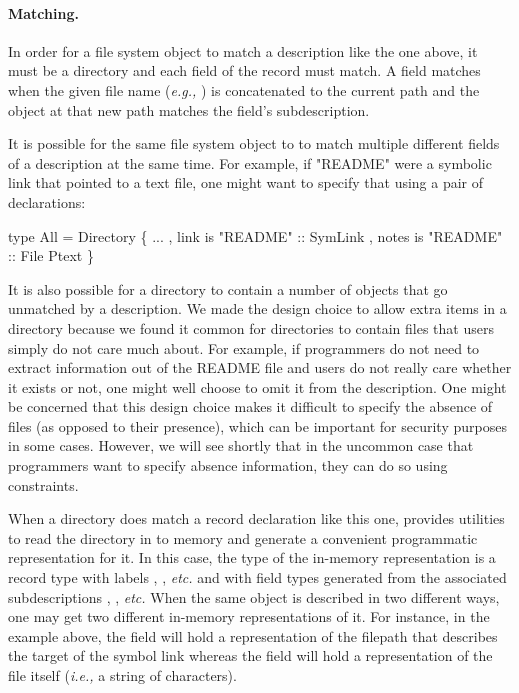 \paragraph*{Matching.}
In order for a file system object to match a description like the one above, it must be a
directory and each field of the record must match.  A field matches when the given
file name ({\em e.g.,} ) is concatenated to the current path and the 
object at that new path matches the field's subdescription.

It is possible for the same file system object to to match multiple different fields of a description at
the same time.  For example, if "README" were a symbolic link that pointed to a text file, one 
might want to specify that using a pair of declarations:
\begin{code}
type All = Directory
  \{ ...
  , link is "README" :: SymLink
  , notes is "README" :: File Ptext
  \}
\end{code}

It is also possible for a directory to contain a number of objects that go unmatched by
a description.  We made the design choice to allow extra items in
a directory because we found it common for directories to contain files that users
simply do not care much about.  For example,
if programmers do not need to extract information out of the README file and
users do not really care whether it exists or not, one might well choose
to omit it from the description.  One might be concerned that this design choice makes it difficult to specify
the absence of files (as opposed to their presence), which can be important
for security purposes in some cases.  However, we will see shortly that in the
uncommon case that programmers want to specify absence information, they can
do so using constraints.

When a directory does match a record declaration like this one, 
\forest{} provides utilities to read the directory in
to memory and generate a convenient programmatic representation for it.  
In this case, the type of the in-memory representation is a record type
with labels , , {\em etc.} and with field types
generated from the associated \forest{} subdescriptions , ,
{\em etc.}  When the same object is described in two different ways, one may
get two different in-memory representations of it.  For instance, in the example above,
the  field will hold a representation of the filepath that describes the target of the
symbol link whereas the  field will hold a representation of the 
file itself ({\em i.e.,} a string of characters).

